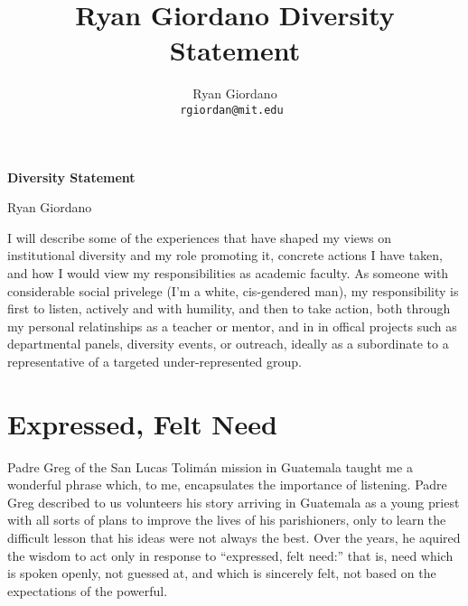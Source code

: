 
\usepackage{enumitem}

\usepackage{geometry}
\geometry{top=0.9in}
\geometry{left=1.4in}
\geometry{right=1.4in}


\title{Ryan Giordano Diversity Statement}

\author{
  Ryan Giordano \\ \texttt{rgiordan@mit.edu }
}



\begin{minipage}[t]{0.5\textwidth}
\hspace{-2em} %
{\bf \LARGE Diversity Statement}\\
\end{minipage}
\begin{minipage}[t]{0.5\textwidth}
        \hspace{8em} %
        {\LARGE Ryan Giordano}
\end{minipage}



I will describe some of the experiences that have shaped my views on
institutional diversity and my role promoting it, concrete actions I have taken,
and how I would view my responsibilities as academic faculty.  As someone with
considerable social privelege (I'm a white, cis-gendered man), my responsibility
is first to listen, actively and with humility, and then to take action, both
through my personal relatinships as a teacher or mentor, and in in offical
projects such as departmental panels, diversity events, or outreach, ideally as
a subordinate to a representative of a targeted under-represented group.


\section{Expressed, Felt Need}

Padre Greg of the San Lucas Tolimán mission in Guatemala taught me a wonderful
phrase which, to me, encapsulates the importance of listening.  Padre Greg
described to us volunteers his story arriving in Guatemala as a young priest
with all sorts of plans to improve the lives of his parishioners, only to learn
the difficult lesson that his ideas were not always the best. Over the years, he
aquired the wisdom to act only in response to ``expressed, felt need:'' that is,
need which is spoken openly, not guessed at, and which is sincerely felt, not
based on the expectations of the powerful.

